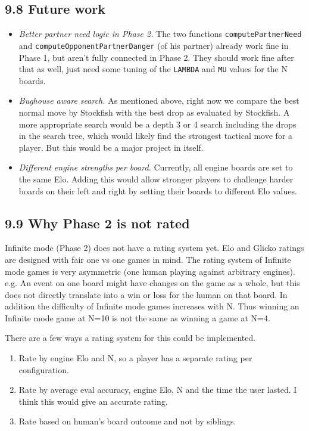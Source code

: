 \documentclass[11pt,a4paper]{article}
\begin{document}
\subsection*{9.8 Future work}
\begin{itemize}

\item \textit{Better partner need logic in Phase 2.} The two functions \texttt{computePartnerNeed} and \texttt{computeOpponentPartnerDanger} (of his partner) already work fine in Phase 1, but aren’t fully connected in Phase 2. They should work fine after that as well, just need some tuning of the \texttt{LAMBDA} and \texttt{MU} values for the N boards.

\item \textit{Bughouse aware search.} As mentioned above, right now we compare the best normal move by Stockfish with the best drop as evaluated by Stockfish. A more appropriate search would be a depth 3 or 4 search including the drops in the search tree, which would likely find the strongest tactical move for a player. But this would be a major project in itself.

\item \textit{Different engine strengths per board.} Currently, all engine boards are set to the same Elo. Adding this would allow stronger players to challenge harder boards on their left and right by setting their boards to different Elo values.

\end{itemize}

\subsection*{9.9 Why Phase 2 is not rated}
Infinite mode (Phase 2) does not have a rating system yet. Elo and Glicko ratings are designed with fair one vs one games in mind. The rating system of Infinite mode games is very asymmetric (one human playing against arbitrary engines).
e.g. An event on one board might have changes on the game as a whole, but this does not directly translate into a win or loss for the human on that board. In addition the difficulty of Infinite mode games increases with N. Thus winning an Infinite mode game at N=10 is not the same as winning a game at N=4.

There are a few ways a rating system for this could be implemented.
\begin{enumerate}
    \item Rate by engine Elo and N, so a player has a separate rating per configuration.
    \item Rate by average eval accuracy, engine Elo, N and the time the user lasted. I think this would give an accurate rating.
    \item Rate based on human's board outcome and not by siblings.
\end{enumerate}
\end{document}

